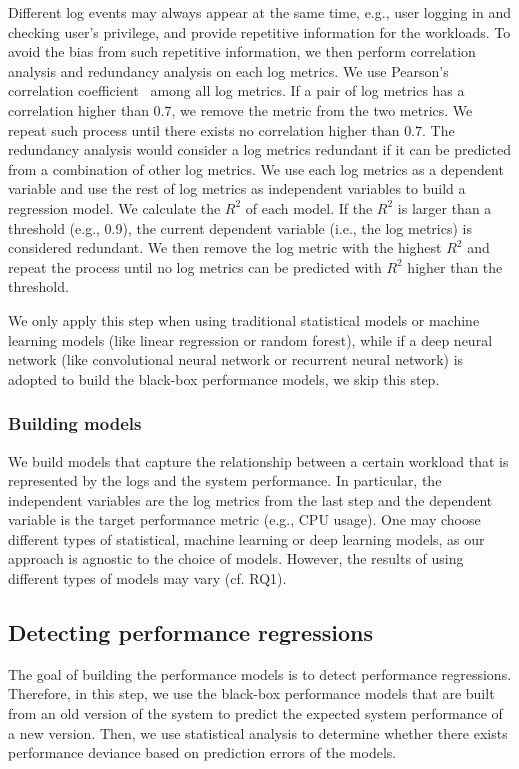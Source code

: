 Different log events may always appear at the same time, e.g., user logging in and checking user's privilege, and provide repetitive information for the workloads. To avoid the bias from such repetitive information, we then perform correlation analysis and redundancy analysis on each log metrics. We use Pearson's correlation coefficient~\citep{benesty2009pearson} among all log metrics. If a pair of log metrics has a correlation higher than $0.7$, we remove the metric from the two metrics. We repeat such process until there exists no correlation higher than $0.7$. The redundancy analysis would consider a log metrics redundant if it can be predicted from a combination of other log metrics. We use each log metrics as a dependent variable and use the rest of log metrics as independent variables to build a regression model. We calculate the $R^2$ of each model. If the $R^2$ is larger than a threshold (e.g., 0.9), the current dependent variable (i.e., the log metrics) is considered redundant. We then remove the log metric with the highest $R^2$ and repeat the process until no log metrics can be predicted with $R^2$ higher than the threshold. 

We only apply this step when using traditional statistical models or machine learning models (like linear regression or random forest), while if a deep neural network (like convolutional neural network or recurrent neural network) is adopted to build the black-box performance models, we skip this step.


\subsubsection{Building models}
We build models that capture the relationship between a certain workload that is represented by the logs and the system performance. In particular, the independent variables are the log metrics from the last step and the dependent variable is the target performance metric (e.g., CPU usage). One may choose different types of statistical, machine learning or deep learning models, as our approach is agnostic to the choice of models. However, the results of using different types of models may vary (cf. RQ1). 


\subsection{Detecting performance regressions} \label{sec:comparions-approaches}

The goal of building the performance models is to detect performance regressions. Therefore, in this step, we use the black-box performance models that are built from an old version of the system to predict the expected system performance of a new version. Then, we use statistical analysis to determine whether there exists performance deviance based on prediction errors of the models.

